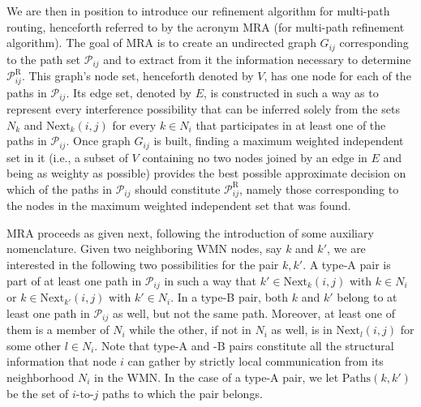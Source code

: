 \documentclass{article}
\begin{document}
We are then in position to introduce our refinement algorithm for multi-path
routing, henceforth referred to by the acronym MRA (for multi-path refinement
algorithm). The goal of MRA is to create an undirected graph $G_{ij}$
corresponding to the path set $\mathcal{P}_{ij}$ and to extract from it the
information necessary to determine $\mathcal{P}^\mathrm{R}_{ij}$. This graph's
node set, henceforth denoted by $V$, has one node for each of the paths in
$\mathcal{P}_{ij}$. Its edge set, denoted by $E$, is constructed in such a way
as to represent every interference possibility that can be inferred solely from
the sets $N_k$ and $\mathrm{Next}_k(i,j)$ for every $k\in N_i$ that participates
in at least one of the paths in $\mathcal{P}_{ij}$. Once graph $G_{ij}$ is
built, finding a maximum weighted independent set in it (i.e., a subset of $V$
containing no two nodes joined by an edge in $E$ and being as weighty as
possible) provides the best possible approximate decision on which of the paths
in $\mathcal{P}_{ij}$ should constitute $\mathcal{P}^\mathrm{R}_{ij}$, namely
those corresponding to the nodes in the maximum weighted independent set that
was found.

MRA proceeds as given next, following the introduction of some auxiliary
nomenclature. Given two neighboring WMN nodes, say $k$ and $k'$, we are
interested in the following two possibilities for the pair $k,k'$. A type-A pair
is part of at least one path in $\mathcal{P}_{ij}$ in such a way that
$k'\in\mathrm{Next}_k(i,j)$ with $k\in N_i$ or $k\in\mathrm{Next}_{k'}(i,j)$
with $k'\in N_i$. In a type-B pair, both $k$ and $k'$ belong to at least one
path in $\mathcal{P}_{ij}$ as well, but not the same path. Moreover, at least
one of them is a member of $N_i$ while the other, if not in $N_i$ as well, is in
$\mathrm{Next}_l(i,j)$ for some other $l\in N_i$. Note that type-A and -B pairs
constitute all the structural information that node $i$ can gather by strictly
local communication from its neighborhood $N_i$ in the WMN. In the case of a
type-A pair, we let $\mathrm{Paths}(k,k')$ be the set of $i$-to-$j$ paths to
which the pair belongs.
\end{document}
